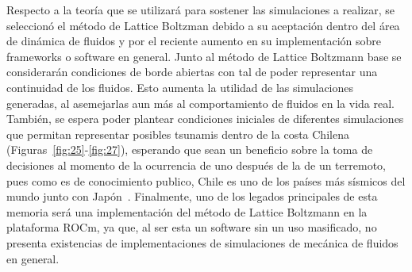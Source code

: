 Respecto a la teoría que se utilizará para sostener las simulaciones a realizar, se seleccionó el método de Lattice Boltzman debido a su aceptación dentro del área de dinámica de fluidos y por el reciente aumento en su implementación sobre frameworks o software en general. 
Junto al método de Lattice Boltzmann base se considerarán condiciones de borde abiertas con tal de poder representar una continuidad de los fluidos.
Esto aumenta la utilidad de las simulaciones generadas, al asemejarlas aun más al comportamiento de fluidos en la vida real.
También, se espera poder plantear condiciones iniciales de diferentes simulaciones que permitan representar posibles tsunamis dentro de la costa Chilena (Figuras~\ref{fig:25}-\ref{fig:27}), esperando que sean un beneficio sobre la toma de decisiones al momento de la ocurrencia de uno después de la de un terremoto, pues como es de conocimiento publico, Chile es uno de los países más sísmicos del mundo junto con Japón~\cite{quake}.
Finalmente, uno de los legados principales de esta memoria será una implementación del método de Lattice Boltzmann en la plataforma ROCm, ya que, al ser esta un software sin un uso masificado, no presenta existencias de implementaciones de simulaciones de mecánica de fluidos en general.